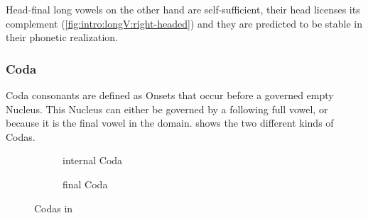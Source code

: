 Head-final long vowels on the other hand are self-sufficient,
their head licenses its complement (\cref{fig:intro:longV:right-headed})
and they are predicted to be stable in their phonetic realization.


\subsubsection{Coda}\label{intro:obj:coda}
Coda consonants are defined as Onsets that occur before
a governed empty Nucleus. \parencite[p.~192]{scheer2004}
This Nucleus can either be governed by a following full
vowel,  or because it is the final
vowel in the domain.
 shows the two different kinds
of Codas.

\begin{figure}[h]
  \centering
  \begin{subfigure}{.49\textwidth}
    \centering
    \begin{structure}{}
      \emptyV[gov]
    \end{structure}
    \caption{internal Coda}
  \end{subfigure}
  \hfill
  \begin{subfigure}{.49\textwidth}
    \centering
    \begin{structure}{}
      \fen
    \end{structure}
    \caption{final Coda}
  \end{subfigure}
  \caption{Codas in \CVCV}
  \label{fig:intro:obj:coda}
\end{figure}

